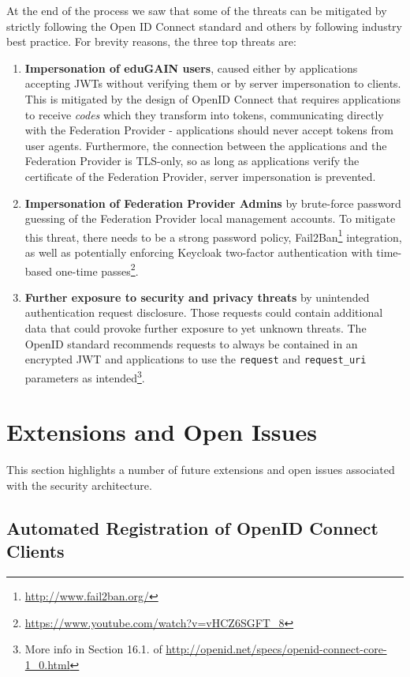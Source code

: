 \documentclass{llncs}
\begin{document}
At the end of the process we saw that some of the threats can be mitigated by strictly following the Open ID Connect standard and others by following industry best practice. For brevity reasons, the three top threats are:

\begin{enumerate}
	\item \textbf{Impersonation of eduGAIN users}, caused either by applications accepting JWTs without verifying them or by server impersonation to clients. This is mitigated by the design of OpenID Connect that requires applications to receive \textit{codes} which they transform into tokens, communicating directly with the Federation Provider - applications should never accept tokens from user agents. Furthermore, the connection between the applications and the Federation Provider is TLS-only, so as long as applications verify the certificate of the Federation Provider, server impersonation is prevented.
	\item \textbf{Impersonation of Federation Provider Admins} by brute-force password guessing of the Federation Provider local management accounts. To mitigate this threat, there needs to be a strong password policy, Fail2Ban\footnote{\url{http://www.fail2ban.org/}} integration, as well as potentially enforcing Keycloak two-factor authentication with time-based one-time passes\footnote{\url{https://www.youtube.com/watch?v=vHCZ6SGFT\_8}}.
	\item \textbf{Further exposure to security and privacy threats} by unintended authentication request disclosure. Those requests could contain additional data that could provoke further exposure to yet unknown threats. The OpenID standard recommends requests to always be contained in an encrypted JWT and applications to use the \texttt{request} and \texttt{request\_uri} parameters as intended\footnote{More info in Section 16.1. of \url{http://openid.net/specs/openid-connect-core-1\_0.html}}.
\end{enumerate}

\section{Extensions and Open Issues}
\label{sec:future}

This section highlights a number of future extensions and open issues associated with the security architecture.

\subsection{Automated Registration of OpenID Connect Clients}
\end{document}
